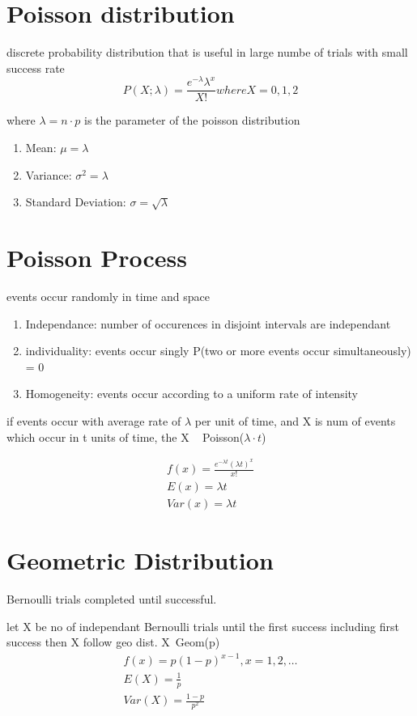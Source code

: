 \documentclass[11pt]{amsart}
\begin{document}
\section{Poisson distribution}
\par discrete probability distribution that is useful in large numbe of trials
with small success rate
\begin{equation}
  P(X;\lambda) = \frac{e^{-\lambda} \lambda^x}{X!} where X = 0,1,2
\end{equation}
\par where $\lambda = n \cdot p$ is the parameter of the poisson distribution
\begin{enumerate}
  \item Mean: $\mu = \lambda$
  \item Variance: $\sigma^2 = \lambda$
  \item Standard Deviation: $\sigma = \sqrt{\lambda}$
\end{enumerate}
\section{Poisson Process}
\par events occur randomly in time and space
\begin{enumerate}
  \item Independance: number of occurences in disjoint intervals are independant
  \item individuality: events occur singly P(two or more events occur simultaneously) = 0
  \item Homogeneity: events occur according to a uniform rate of intensity
\end{enumerate}
\par if events occur with average rate of $\lambda$ per unit of time, and X is num of events which occur in t units of time, the X ~ Poisson($\lambda\cdot t$)
\begin{equation *}

  \begin{align}
    f(x)  = \frac{e^{-\lambda t}(\lambda t)^x}{x!}\\
    E(x) = \lambda t\\
    Var(x) = \lambda t
  \end{align}
\end{equation *}
\section{Geometric Distribution}
\par Bernoulli trials completed until successful.
\par let X be no of independant Bernoulli trials until the first success including first success then X follow geo dist. X~Geom(p)
\begin{equation}
  \begin{align*}
    f(x) = p(1-p)^{x-1}, x = 1,2,\dots\\
    E(X) = \frac{1}{p}\\
    Var(X) = \frac{1-p}{p^2}
  \end{align*}
\end{equation}
\end{document}
